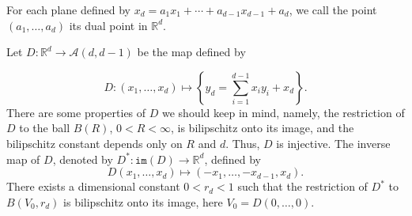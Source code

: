 \documentclass[11pt]{article}
\newcommand{\1}{\mathbf{1}}
\begin{document}
For each plane defined by $x_d=a_1x_1+\cdots+a_{d-1}x_{d-1}+a_d$, we call the point $(a_1, \ldots, a_d)$ its dual point in $\mathbb{R}^d$. 

Let $D\colon \mathbb{R}^d\to \mathcal{A}(d, d-1)$ be the map defined by 

\[D \colon (x_1,\ldots,x_d) \mapsto \left\lbrace y_d=\sum_{i=1}^{d-1} x_iy_i+x_d\right\rbrace.\]
There are some properties of $D$ we should keep in mind, namely, the restriction of $D$ to the ball $B(R)$, $0<R<\infty$, is bilipschitz onto its image, and the bilipschitz constant depends only on $R$ and $d$. Thus, $D$ is injective. The inverse map of $D$, denoted by $D^*\colon \mathtt{im}(D)\to \mathbb{R}^d$, defined by 
\[D(x_1, \ldots, x_d)\mapsto (-x_1, \ldots, -x_{d-1}, x_d).\]
There exists a dimensional constant $0<r_d<1$ such that the restriction of $D^*$ to $B(V_0, r_d)$ is bilipschitz onto its image, here $V_0=D(0, \ldots, 0)$. 
\end{document}
